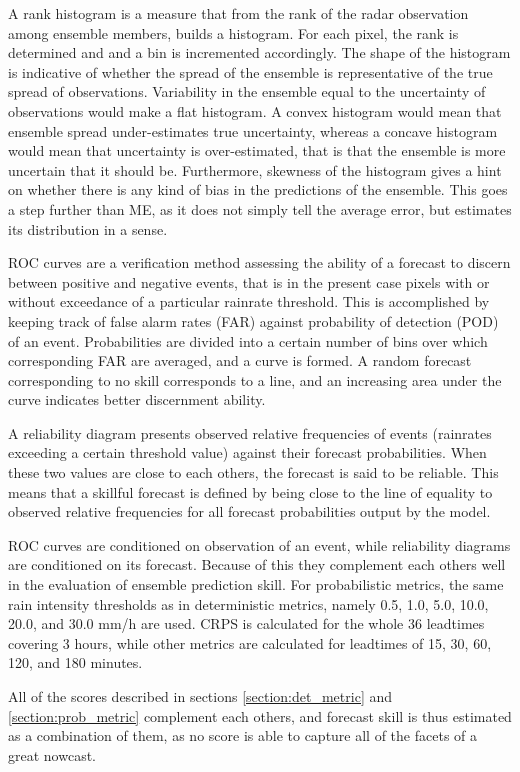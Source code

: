 A rank histogram is a measure that from the rank of the radar observation among ensemble members, builds a histogram. For each pixel, the rank is determined and and a bin is incremented accordingly. The shape of the histogram is indicative of  whether the spread of the ensemble is representative of the true spread of observations. Variability in the ensemble equal to the uncertainty of observations would make a flat histogram. A convex histogram would mean that ensemble spread under-estimates true uncertainty, whereas a concave histogram would mean that uncertainty is over-estimated, that is that the ensemble is more uncertain that it should be. Furthermore, skewness of the histogram gives a hint on whether there is any kind of bias in the predictions of the ensemble. This goes a step further than ME, as it does not simply tell the average error, but estimates its distribution in a sense. 


ROC curves \cite{mason1982model} are a verification method assessing the ability of a forecast to discern between positive and negative events, that is in the present case pixels with or without exceedance of a particular rainrate threshold. This is accomplished by keeping track of false alarm rates (FAR) against probability of detection (POD) of an event. Probabilities are divided into a certain number of bins over which corresponding FAR are averaged, and a curve is formed. A random forecast corresponding to no skill corresponds to a line, and an increasing area under the curve indicates better discernment ability. 

A reliability diagram presents observed relative frequencies of events (rainrates exceeding a certain threshold value) against their forecast probabilities. When these two values are close to each others, the forecast is said to be reliable. This means that a skillful forecast is defined by being close to the line of equality to observed relative frequencies for all forecast probabilities output by the model. 

ROC curves are conditioned on observation of an event, while reliability diagrams are conditioned on its forecast. Because of this they complement each others well in the evaluation of ensemble prediction skill. For probabilistic metrics, the same rain intensity thresholds as in deterministic metrics, namely 0.5, 1.0, 5.0, 10.0, 20.0, and 30.0 mm/h are used. CRPS is calculated for the whole 36 leadtimes covering 3 hours, while other metrics are calculated for leadtimes of 15, 30, 60, 120, and 180 minutes. 


 All of the scores described in sections \ref{section:det_metric} and \ref{section:prob_metric} complement each others, and forecast skill is thus estimated as a combination of them, as no score is able to capture all of the facets of a great nowcast. 
 

